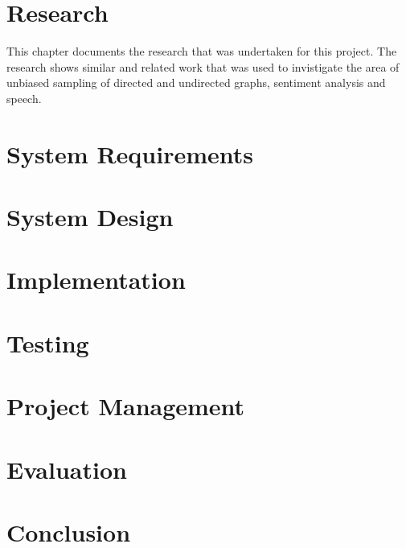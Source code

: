 \documentclass[11pt]{report}
\begin{document}
\chapter{Research}
This chapter documents the research that was undertaken for this project. The research shows similar and related work that was used to invistigate the area of unbiased sampling of directed and undirected graphs, sentiment analysis and speech. 


\chapter{System Requirements}


\chapter{System Design}


\chapter{Implementation}


\chapter{Testing}

\chapter{Project Management}


\chapter{Evaluation}

\chapter{Conclusion}





\end{document}

